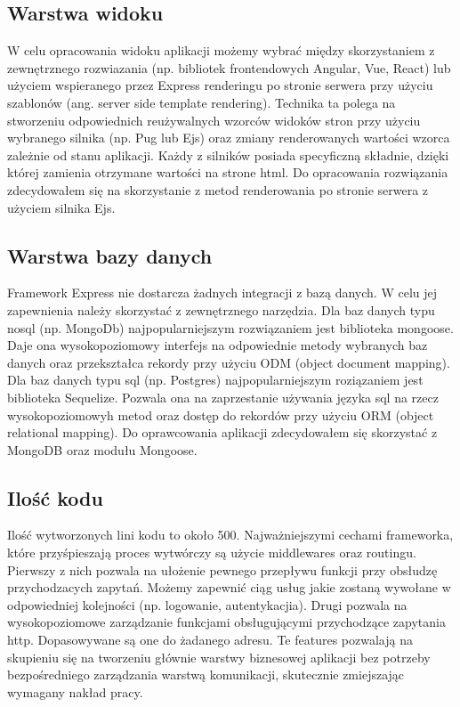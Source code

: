 \documentclass[12pt]{report}
\begin{document}
    \subsection{Warstwa widoku}
      W celu opracowania widoku aplikacji możemy wybrać między skorzystaniem z zewnętrznego rozwiazania (np. bibliotek frontendowych Angular, Vue, React) lub użyciem wspieranego przez Express renderingu po stronie serwera przy użyciu szablonów (ang. server side template rendering).
      Technika ta polega na stworzeniu odpowiednich reużywalnych wzorców widoków stron przy użyciu wybranego silnika (np. Pug lub Ejs) oraz zmiany renderowanych wartości wzorca zależnie od stanu aplikacji. 
      Każdy z silników posiada specyficzną składnie, dzięki której zamienia otrzymane wartości na strone html.
      Do opracowania rozwiązania zdecydowałem się na skorzystanie z metod renderowania po stronie serwera z użyciem silnika Ejs.

    \subsection{Warstwa bazy danych}
      Framework Express nie dostarcza żadnych integracji z bazą danych. 
      W celu jej zapewnienia należy skorzystać z zewnętrznego narzędzia.
      Dla baz danych typu nosql (np. MongoDb) najpopularniejszym rozwiązaniem jest biblioteka mongoose.
      Daje ona wysokopoziomowy interfejs na odpowiednie metody wybranych baz danych oraz przekształca rekordy przy użyciu ODM (object document mapping).
      Dla baz danych typu sql (np. Postgres) najpopularniejszym roziązaniem jest biblioteka Sequelize.
      Pozwala ona na zaprzestanie używania języka sql na rzecz wysokopoziomowyh metod oraz dostęp do rekordów przy użyciu ORM (object relational mapping).
      Do oprawcowania aplikacji zdecydowałem się skorzystać z MongoDB oraz modułu Mongoose.

    \subsection{Ilość kodu}
      Ilość wytworzonych lini kodu to około 500. 
      Najważniejszymi cechami frameworka, które przyśpieszają proces wytwórczy są użycie middlewares oraz routingu.
      Pierwszy z nich pozwala na ułożenie pewnego przepływu funkcji przy obsłudzę przychodzacych zapytań.
      Możemy zapewnić ciąg usług jakie zostaną wywołane w odpowiedniej kolejności (np. logowanie, autentykacjia).
      Drugi pozwala na wysokopoziomowe zarządzanie funkcjami obsługującymi przychodzące zapytania http.
      Dopasowywane są one do żadanego adresu.
      Te features pozwalają na skupieniu się na tworzeniu głównie warstwy biznesowej aplikacji bez potrzeby bezpośredniego zarządzania warstwą komunikacji, skutecznie zmiejszając wymagany nakład pracy.
\end{document}
